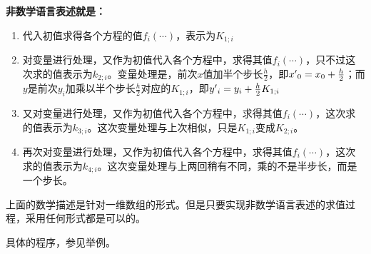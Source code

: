 \hypertarget{program}{\textbf{非数学语言表述就是：}}
\begin{enumerate}
\item 代入初值求得各个方程的值$f_i(\cdots)$，表示为$K_{1;i}$
\item 对变量进行处理，又作为初值代入各个方程中，求得其值$f_i(\cdots)$，只不过这次求的值表示为$k_{2;i}$。变量处理是，前次$x$值加半个步长$\frac{h}{2}$，即$x\rq{}_0=x_0+\frac{h}{2}$；而$y$是前次$y_i$加乘以半个步长$\frac{h}{2}$对应的$K_{1;i}$，即$y\rq{}_i=y_i+\frac{h}{2}K_{1;i}$
\item 又对变量进行处理，又作为初值代入各个方程中，求得其值$f_i(\cdots)$，这次求的值表示为$k_{3;i}$。这次变量处理与上次相似，只是$K_{1;i}$变成$K_{2;i}$。
\item 再次对变量进行处理，又作为初值代入各个方程中，求得其值$f_i(\cdots)$，这次求的值表示为$k_{4;i}$。这次变量处理与上两回稍有不同，乘的不是半步长，而是一个步长。
\end{enumerate}
上面的数学描述是针对一维数组的形式。但是只要实现非数学语言表述的求值过程，采用任何形式都是可以的。

具体的程序，参见举例。



